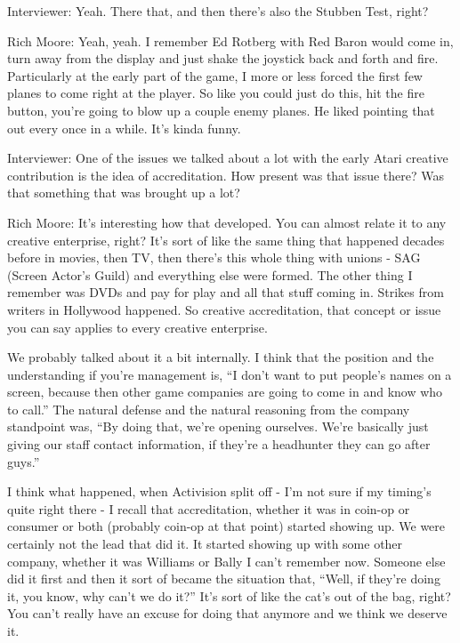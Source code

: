 \textcolor{interviewer}{Interviewer:} Yeah. There that, and then there’s also the Stubben Test, right?

\textcolor{interviewee}{Rich Moore:} Yeah, yeah. I remember Ed Rotberg with Red Baron would come in, turn away from the display and just shake the joystick back and forth and fire. Particularly at the early part of the game, I more or less forced the first few planes to come right at the player. So like you could just do this, hit the fire button, you're going to blow up a couple enemy planes. He liked pointing that out every once in a while. It's kinda funny.

\textcolor{interviewer}{Interviewer:} One of the issues we talked about a lot with the early Atari creative contribution is the idea of accreditation. How present was that issue there? Was that something that was brought up a lot?

\textcolor{interviewee}{Rich Moore:} It's interesting how that developed. You can almost relate it to any creative enterprise, right? It's sort of like the same thing that happened decades before in movies, then TV, then there’s this whole thing with unions - SAG (Screen Actor’s Guild) and everything else were formed. The other thing I remember was DVDs and pay for play and all that stuff coming in. Strikes from writers in Hollywood happened. So creative accreditation, that concept or issue you can say applies to every creative enterprise.

We probably talked about it a bit internally. I think that the position and the understanding if you're management is, “I don't want to put people's names on a screen, because then other game companies are going to come in and know who to call.” The natural defense and the natural reasoning from the company standpoint was, “By doing that, we’re opening ourselves. We're basically just giving our staff contact information, if they’re a headhunter they can go after guys.” 

I think what happened, when Activision split off - I’m not sure if my timing’s quite right there - I recall that accreditation, whether it was in coin-op or consumer or both (probably coin-op at that point) started showing up. We were certainly not the lead that did it. It started showing up with some other company, whether it was Williams or Bally I can't remember now. Someone else did it first and then it sort of became the situation that, “Well, if they're doing it, you know, why can't we do it?” It's sort of like the cat's out of the bag, right? You can't really have an excuse for doing that anymore and we think we deserve it. 

